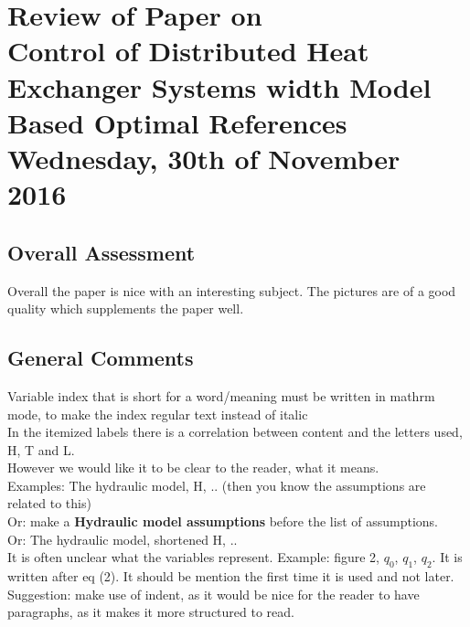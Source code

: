 
\renewcommand{\vec}[1]{\boldsymbol{\mathbf{#1}}}

\renewcommand\chaptername{KAPITEL}
\renewcommand\contentsname{Indhold}
\renewcommand\figurename{Figur}
\renewcommand\tablename{Tabel}

\section*{Review of Paper on\\
Control of Distributed Heat Exchanger Systems width
Model Based Optimal References\\
\small Wednesday, 30th of November 2016}
\subsection{Overall Assessment}
Overall the paper is nice with an interesting subject. The pictures are of a good quality which supplements the paper well. 

\subsection{General Comments}

\noindent Variable index that is short for a word/meaning must be written in mathrm mode, to make the index regular text instead of italic \\
 
\noindent In the itemized labels there is a correlation between content and the letters used, H, T and L. \\
However we would like it to be clear to the reader, what it means. \\
Examples: The hydraulic model, H, .. (then you know the assumptions are related to this) \\
Or: make a \textbf{Hydraulic model assumptions} before the list of assumptions. \\
Or: The hydraulic model, shortened H, .. \\

\noindent It is often unclear what the variables represent. Example: figure 2, $q_0$, $q_1$, $q_2$.  It is written after eq (2). It should be mention the first time it is used and not later.\\
Suggestion: make use of indent, as it would be nice for the reader to have paragraphs, as it makes it more structured to read. \\
 
